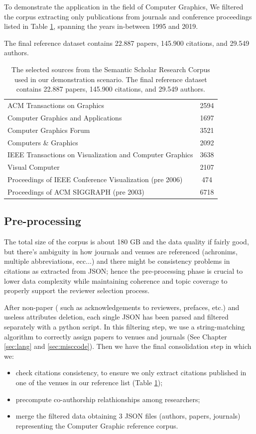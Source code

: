 To demonstrate the application in the field of Computer Graphics, We filtered the corpus extracting only publications from journals and conference proceedings listed in Table \ref{table:sources}, spanning the years in-between 1995 and 2019. 

The final reference dataset contains 22.887 papers, 145.900 citations, and 29.549 authors.
\begin{table}[!ht]
\renewcommand{\arraystretch}{1.3}
\centering
\begin{tabular}{|l|c|}
\hline
ACM Transactions on Graphics & 2594\\ 
Computer Graphics and Applications  & 1697 \\ 
Computer Graphics Forum & 3521\\ 
Computers \& Graphics & 2092\\ 
IEEE Transactions on Visualization and Computer Graphics & 3638\\ 
Visual Computer & 2107\\ 
Proceedings of IEEE Conference Visualization (pre 2006) & 474 \\ 
Proceedings of ACM SIGGRAPH (pre 2003) & 6718\\
\hline
\end{tabular}
\caption{The selected sources from the Semantic Scholar Research Corpus used in our demonstration scenario. The final reference dataset contains 22.887 papers, 145.900 citations, and 29.549 authors.}
\label{table:sources}
\end{table}

%
\subsection*{Pre-processing}
\label{sec:preproc}

The total size of the corpus is about 180 GB and the data quality if fairly good, but there's ambiguity in how journals and venues are referenced (achronims, multiple abbreviations, ecc...) and there might be consistency problems in citations as extracted from JSON; hence the pre-processing phase is crucial to lower data complexity while maintaining coherence and topic coverage to properly support the reviewer selection process. 

After non-paper ( such as acknowledgements to reviewers, prefaces, etc.) and useless attributes deletion, each single JSON has been parsed and filtered separately with a python script. In this filtering step, we use a string-matching algorithm to correctly assign papers to venues and journals (See Chapter \ref{sec:lang} and \ref{sec:misccode}). Then we have the final consolidation step in which we:
\begin{itemize}
    \item check citations consistency, to ensure we only extract citations published in one of the venues in our reference list (Table \ref{table:sources});
    \item precompute co-authorship relathionships among researchers;
    \item merge the filtered data obtaining 3 JSON files (authors, papers, journals) representing the Computer Graphic reference corpus.
\end{itemize}

